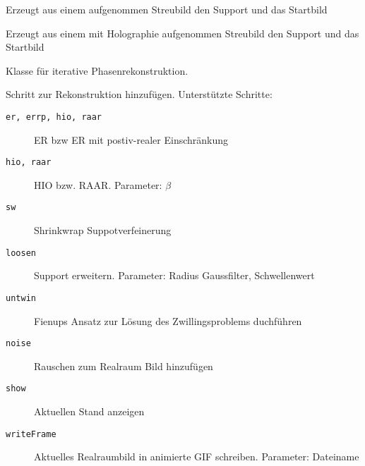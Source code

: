 	
\begin{description}[style=nextline]
		
	\item [\texttt{\textit{[]}=SupportGeneric\textit{()}}]
	Erzeugt aus einem aufgenommen Streubild den Support und das Startbild
		
	\item [\texttt{\textit{[]}=SupportHolo\textit{()}}]
	Erzeugt aus einem mit Holographie aufgenommen Streubild den Support und das Startbild
		
	\item [\texttt{recon.Plan}] Klasse für iterative Phasenrekonstruktion. 
	\begin{description}[style=nextline]
		\item [\texttt{addStep\textit{(step,iterations,\{parameters\})}}]
		Schritt zur Rekonstruktion hinzufügen. Unterstützte Schritte:
		\begin{description}
			\item[\texttt{er, errp, hio, raar}] ER bzw ER mit postiv-realer Einschränkung
			\item[\texttt{hio, raar}] HIO bzw. RAAR. Parameter: $\beta$
			\item[\texttt{sw}] Shrinkwrap Suppotverfeinerung
			\item[\texttt{loosen}] Support erweitern. Parameter: Radius Gaussfilter, Schwellenwert
			\item[\texttt{untwin}] Fienups Ansatz zur Lösung des Zwillingsproblems duchführen
			\item[\texttt{noise}] Rauschen zum Realraum Bild hinzufügen
			\item[\texttt{show}] Aktuellen Stand anzeigen
			\item[\texttt{writeFrame}] Aktuelles Realraumbild in animierte GIF schreiben. Parameter: Dateiname
		\end{description}	
	\end{description}
\end{description}

\begin{comment}


Hilfmittel
ft2
ift2
maskfilter
pad2size
Simulation
Erzeugun von Objekten
		
-msft
-multislice
-thibault

Rekonstruktion
-wiener
-reconstruct
SW
holo\_support
ERiter
RAARiter
HIOiter
\end{comment}
